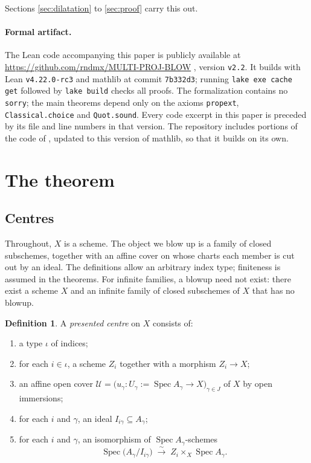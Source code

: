 \documentclass[pdflatex,sn-mathphys-num]{sn-jnl}
\theoremstyle{plain}
\theoremstyle{definition}
\newtheorem{definition}[theorem]{Definition}
\newcommand{\Spec}{\operatorname{Spec}}
\newcommand{\cU}{\mathcal{U}}
\begin{document}
Sections \ref{sec:dilatation} to \ref{sec:proof} carry this out.

\paragraph{Formal artifact.} The Lean code accompanying this paper is
publicly available at \url{https://github.com/rndmx/MULTI-PROJ-BLOW} \cite{blowups-code}, version
\texttt{v2.2}. It builds with Lean \texttt{v4.22.0-rc3} and mathlib at commit
\texttt{7b332d3}; running \texttt{lake exe cache get} followed by
\texttt{lake build} checks all proofs. The formalization contains no \texttt{sorry}; the main
theorems depend only on the axioms \texttt{propext}, \texttt{Classical.choice}
and \texttt{Quot.sound}. Every code excerpt in this paper is
preceded by its file and line numbers in that version.
The repository includes portions of the code of \cite{mayeux-zhang}, updated to
this version of mathlib, so that it builds on its own.

\section{The theorem}

\subsection{Centres}

Throughout, $X$ is a scheme. The object we blow up is a family of closed
subschemes, together with an affine cover on whose charts each member is cut
out by an ideal. The definitions allow an arbitrary index type; finiteness is
assumed in the theorems. For infinite families, a blowup need not exist: there exist a scheme $X$ and an infinite family of closed subschemes of $X$ that has no blowup.

\begin{definition}\label{def:preclos}
A \emph{presented centre} on $X$ consists of:
\begin{enumerate}
\item a type $\iota$ of indices;
\item for each $i \in \iota$, a scheme $Z_i$ together with a morphism
      $Z_i \to X$;
\item an affine open cover $\cU = \bigl( u_\gamma : U_\gamma := \Spec A_\gamma \to X
      \bigr)_{\gamma \in J}$ of $X$ by open immersions;
\item for each $i$ and $\gamma$, an ideal $I_{i\gamma} \subseteq A_\gamma$;
\item for each $i$ and $\gamma$, an isomorphism of $\Spec A_\gamma$-schemes
\[
  \Spec\bigl(A_\gamma / I_{i\gamma}\bigr)
  \;\xrightarrow{\ \sim\ }\;
  Z_i \times_X \Spec A_\gamma .
\]
\end{enumerate}
\end{definition}
\end{document}
